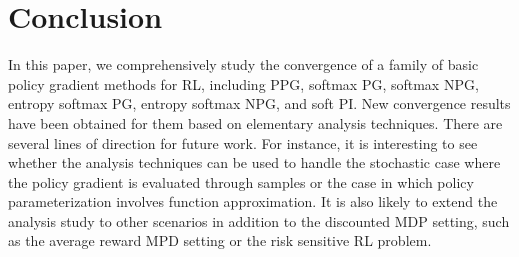\section{Conclusion}\label{sec:conclusion}
In this paper, we comprehensively study the convergence of a family of basic policy gradient methods  for RL, including PPG, softmax PG, softmax NPG, entropy softmax PG, entropy softmax NPG, and soft PI. New  convergence results have been obtained for them based on  elementary analysis techniques.
There are several lines of direction for future work. For instance, it is interesting to see whether the analysis techniques can be used to handle the stochastic case where the policy gradient is evaluated through samples or the case in which  policy parameterization involves function approximation. It is also likely to extend the analysis study to other scenarios in addition to the discounted MDP setting, such as the  average reward MPD setting or the risk sensitive RL problem. 